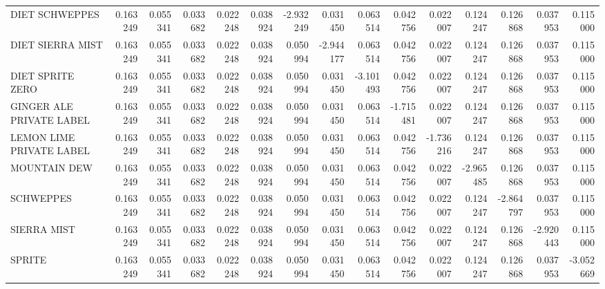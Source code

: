 \begin{tabular}{lrrrrrrrrrrrrrr}
DIET SCHWEPPES                &    0.163249 &         0.055341 &                       0.033682 &                       0.022248 &           0.038924 &       -2.932249 &          0.031450 &          0.063514 &                  0.042756 &                  0.022007 &      0.124247 &   0.126868 &     0.037953 &  0.115000 \\
DIET SIERRA MIST              &    0.163249 &         0.055341 &                       0.033682 &                       0.022248 &           0.038924 &        0.050994 &         -2.944177 &          0.063514 &                  0.042756 &                  0.022007 &      0.124247 &   0.126868 &     0.037953 &  0.115000 \\
DIET SPRITE ZERO              &    0.163249 &         0.055341 &                       0.033682 &                       0.022248 &           0.038924 &        0.050994 &          0.031450 &         -3.101493 &                  0.042756 &                  0.022007 &      0.124247 &   0.126868 &     0.037953 &  0.115000 \\
GINGER ALE PRIVATE LABEL      &    0.163249 &         0.055341 &                       0.033682 &                       0.022248 &           0.038924 &        0.050994 &          0.031450 &          0.063514 &                 -1.715481 &                  0.022007 &      0.124247 &   0.126868 &     0.037953 &  0.115000 \\
LEMON LIME PRIVATE LABEL      &    0.163249 &         0.055341 &                       0.033682 &                       0.022248 &           0.038924 &        0.050994 &          0.031450 &          0.063514 &                  0.042756 &                 -1.736216 &      0.124247 &   0.126868 &     0.037953 &  0.115000 \\
MOUNTAIN DEW                  &    0.163249 &         0.055341 &                       0.033682 &                       0.022248 &           0.038924 &        0.050994 &          0.031450 &          0.063514 &                  0.042756 &                  0.022007 &     -2.965485 &   0.126868 &     0.037953 &  0.115000 \\
SCHWEPPES                     &    0.163249 &         0.055341 &                       0.033682 &                       0.022248 &           0.038924 &        0.050994 &          0.031450 &          0.063514 &                  0.042756 &                  0.022007 &      0.124247 &  -2.864797 &     0.037953 &  0.115000 \\
SIERRA MIST                   &    0.163249 &         0.055341 &                       0.033682 &                       0.022248 &           0.038924 &        0.050994 &          0.031450 &          0.063514 &                  0.042756 &                  0.022007 &      0.124247 &   0.126868 &    -2.920443 &  0.115000 \\
SPRITE                        &    0.163249 &         0.055341 &                       0.033682 &                       0.022248 &           0.038924 &        0.050994 &          0.031450 &          0.063514 &                  0.042756 &                  0.022007 &      0.124247 &   0.126868 &     0.037953 & -3.052669 \\
\bottomrule
\end{tabular}
